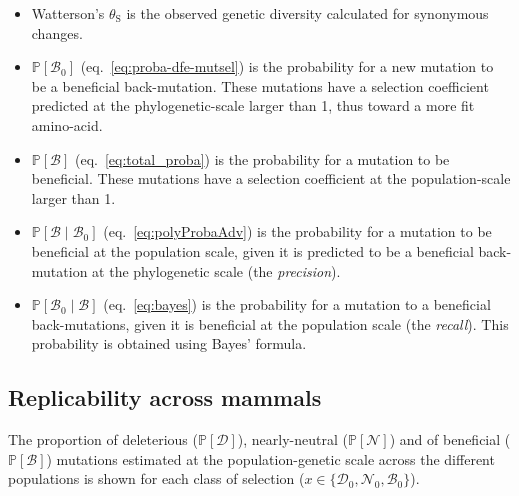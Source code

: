 \documentclass[12pt]{article}
\newcommand{\proba}{\mathbb{P}}
\newcommand{\SphyDel}{\mathcal{D}_0}
\newcommand{\SphyNeu}{\mathcal{N}_0}
\newcommand{\SphyBen}{\mathcal{B}_0}
\newcommand{\Sphyclass}{x}
\newcommand{\given}{\mid}
\newcommand{\SpopDel}{\mathcal{D}}
\newcommand{\SpopNeu}{\mathcal{N}}
\newcommand{\SpopBen}{\mathcal{B}}
\newcommand{\ProbaPopDel}{\proba [ \SpopDel]}
\newcommand{\ProbaPopNeu}{\proba [ \SpopNeu ]}
\newcommand{\ProbaPopBen}{\proba [ \SpopBen ]}
\newcommand{\thetaSyn}{\theta_{\text{S}}}
\begin{document}
    \begin{itemize}
        \item Watterson's $\thetaSyn$ is the observed genetic diversity calculated for synonymous changes.
        \item $\proba [ \SphyBen ]$ (eq.~\ref{eq:proba-dfe-mutsel}) is the probability for a new mutation to be a beneficial back-mutation.
        These mutations have a selection coefficient predicted at the phylogenetic-scale larger than 1, thus toward a more fit amino-acid.
        \item $\proba [ \SpopBen ]$ (eq.~\ref{eq:total_proba}) is the probability for a mutation to be beneficial.
        These mutations have a selection coefficient at the population-scale larger than 1.
        \item $\proba [ \SpopBen \given \SphyBen]$ (eq.~\ref{eq:polyProbaAdv}) is the probability for a mutation to be beneficial at the population scale, given it is predicted to be a beneficial back-mutation at the phylogenetic scale (the \textit{precision}).
        \item $\proba [ \SphyBen \given \SpopBen]$ (eq.~\ref{eq:bayes}) is the probability for a mutation to a beneficial back-mutations, given it is beneficial at the population scale (the \textit{recall}).
        This probability is obtained using Bayes' formula.
    \end{itemize}
    \newpage

    \subsection{Replicability across mammals}
    The proportion of deleterious ($\ProbaPopDel$), nearly-neutral ($\ProbaPopNeu$) and of beneficial ($\ProbaPopBen$) mutations estimated at the population-genetic scale across the different populations is shown for each class of selection ($\Sphyclass \in \{\SphyDel, \SphyNeu, \SphyBen \}$).
\end{document}

